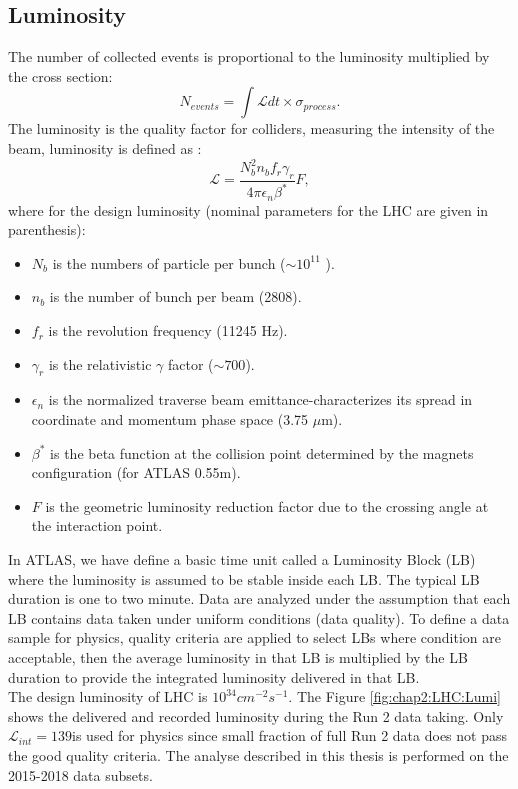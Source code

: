 \subsection{Luminosity}
\label{chap2:LHC:Lumi}
The number of collected events is proportional to the luminosity multiplied by the cross section: 
\begin{equation}
N_{events} = \int\mathcal{L} dt \times \sigma_{process}.
\end{equation}
The luminosity is the quality factor for colliders, measuring the intensity of the beam, luminosity is defined as :
\begin{equation}
\mathcal{L} = \frac{N_b^2n_bf_r\gamma_r}{4\pi\epsilon_n\beta^*}F,
\end{equation}
where for the design luminosity (nominal parameters for the LHC are given in parenthesis):
\begin{itemize}
	\item $N_b$ is the numbers of particle per bunch ($\sim10^{11}$ ).
	\item $n_b$ is the number of bunch per beam (2808).
	\item $f_r$ is the revolution frequency (11245 Hz).
	\item $\gamma_r$ is the relativistic $\gamma$ factor ($\sim 700$).
	\item $\epsilon_n$ is the normalized traverse beam emittance-characterizes its spread in coordinate and momentum phase space (3.75 $\mu$m).
	\item $\beta^*$ is the beta function at the collision point determined by the magnets configuration (for ATLAS 0.55m).
	\item $F$ is the geometric luminosity reduction factor due to the crossing angle at the interaction point.
\end{itemize}
In ATLAS, we have define a basic time unit called a Luminosity Block (LB) where the luminosity is assumed to be stable inside each LB. The typical LB duration is one to two minute. Data are analyzed under the assumption that each LB contains data taken under uniform conditions (data quality). To define a data sample for physics, quality criteria are applied to select LBs where condition are acceptable, then the average luminosity in that LB is multiplied by the LB duration to provide the integrated luminosity delivered in that LB. \\
The design luminosity of LHC is $10^{34} cm^{-2}s^{-1}$. The Figure \ref{fig:chap2:LHC:Lumi} shows the delivered and recorded luminosity during the Run 2 data taking. Only $\mathcal{L}_{int} = 139$\ifb is used for physics since small fraction of full Run 2 data does not pass the good quality criteria. The analyse described in this thesis is performed on the 2015-2018 data subsets.\\
